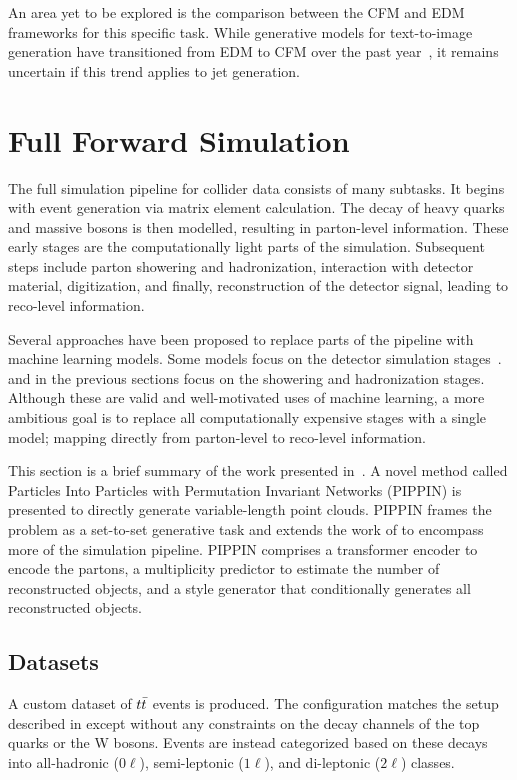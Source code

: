 An area yet to be explored is the comparison between the CFM and EDM frameworks for this specific task.
While generative models for text-to-image generation have transitioned from EDM to CFM over the past year~\cite{SD3,flux2024github}, it remains uncertain if this trend applies to jet generation.

\section{Full Forward Simulation}

The full simulation pipeline for collider data consists of many subtasks.
It begins with event generation via matrix element calculation.
The decay of heavy quarks and massive bosons is then modelled, resulting in parton-level information.
These early stages are the computationally light parts of the simulation.
Subsequent steps include parton showering and hadronization, interaction with detector material, digitization, and finally, reconstruction of the detector signal, leading to reco-level information.

Several approaches have been proposed to replace parts of the pipeline with machine learning models.
Some models focus on the detector simulation stages~\cite{CaloGAN,CaloFlow2,PhysicsGAN,ATLASGAN,CaloVQ}.
\pcjedi and \pcdroid in the previous sections focus on the showering and hadronization stages.
Although these are valid and well-motivated uses of machine learning, a more ambitious goal is to replace all computationally expensive stages with a single model; mapping directly from parton-level to reco-level information.

This section is a brief summary of the work presented in~\textcite{PIPPIN}.
A novel method called Particles Into Particles with Permutation Invariant Networks (PIPPIN) is presented to directly generate variable-length point clouds.
PIPPIN frames the problem as a set-to-set generative task and extends the work of \pcdroid to encompass more of the simulation pipeline.
PIPPIN comprises a transformer encoder to encode the partons, a multiplicity predictor to estimate the number of reconstructed objects, and a \pcdroid style generator that conditionally generates all reconstructed objects.

\subsection{Datasets}

A custom dataset of $t\bar{t}$ events is produced.
The configuration matches the setup described in  except without any constraints on the decay channels of the top quarks or the W bosons.
Events are instead categorized based on these decays into all-hadronic ($0\ell$), semi-leptonic ($1\ell$), and di-leptonic ($2\ell$) classes.

